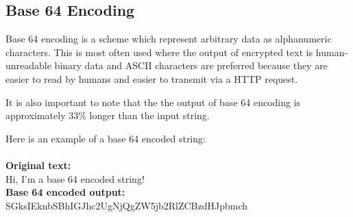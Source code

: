 \subsection{Base 64 Encoding}
\label{sec:base64}

Base 64 encoding is a scheme which represent arbitrary data as alphanumeric
characters. This is most often used where the output of encrypted text is
human-unreadable binary data and ASCII characters are preferred because they are
easier to read by humans and easier to transmit via a HTTP request.

It is also important to note that the the output of base 64 encoding is approximately
33\% longer than the input string.

Here is an example of a base 64 encoded string:\\\\
\textbf{Original text:}\\
Hi, I'm a base 64 encoded string!\\
\textbf{Base 64 encoded output:}\\
SGksIEknbSBhIGJhc2UgNjQgZW5jb2RlZCBzdHJpbmch
